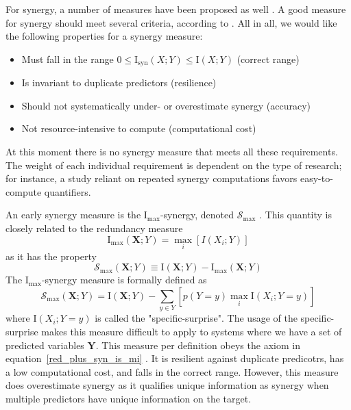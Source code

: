 \documentclass[../main.tex]{subfiles}
\begin{document}
For synergy, a number of measures have been proposed as well \cite{griffith2014quantifying, olbrich2015information}.
A good measure for synergy should meet several criteria, according to \cite{griffith2014quantifying}.
All in all, we would like the following properties for a synergy measure:
%
\begin{itemize}
\item Must fall in the range $0 \le \mathrm{I}_\mathrm{syn}(X;Y) \le \mathrm{I} (X;Y)$ (correct range)
\item Is invariant to duplicate predictors (resilience)
\item Should not systematically under- or overestimate synergy (accuracy)
\item Not resource-intensive to compute (computational cost)
\end{itemize}
%
At this moment there is no synergy measure that meets all these requirements.
The weight of each individual requirement is dependent on the type of research; for instance, a study reliant on repeated synergy computations favors easy-to-compute quantifiers.

An early synergy measure is the $\mathrm{I}_\mathrm{max}$-synergy, denoted $\mathcal{S}_\mathrm{max}$ \cite{williams2010nonnegative}.
This quantity is closely related to the redundancy measure
%
\begin{equation}
\mathrm{I}_\mathrm{max} (\mathbf{X};Y) = \max_i [I(X_{i};Y)]
\end{equation}
%
as it has the property
%
\begin{equation}
\mathcal{S}_\mathrm{max} (\mathbf{X};Y) \equiv \mathrm{I}(\mathbf{X};Y) - \mathrm{I}_\mathrm{max} (\mathbf{X};Y)
\end{equation}
%
The $\mathrm{I}_\mathrm{max}$-synergy measure is formally defined as
%
\begin{equation}
\mathcal{S}_\mathrm{max} (\mathbf{X};Y) = \mathrm{I}(\mathbf{X};Y) - \sum_{y \in Y} [ p(Y = y) \max_i \mathrm{I} (X_i ; Y = y) ]
\end{equation}
%
where $\mathrm{I} (X_i ; Y = y)$ is called the "specific-surprise".
The usage of the specific-surprise makes this measure difficult to apply to systems where we have a set of predicted variables $\mathbf{Y}$.
This measure per definition obeys the axiom in equation~\ref{red_plus_syn_is_mi} \cite{griffith2014quantifying}.
It is resilient against duplicate predicotrs, has a low computational cost, and falls in the correct range.
However, this measure does overestimate synergy as it qualifies unique information as synergy when multiple predictors have unique information on the target.
\end{document}
